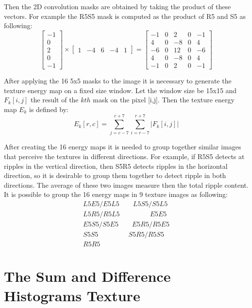 Then the 2D convolution masks are obtained by taking the product of these vectors. For example the R5S5 mask is computed as the product of R5 and S5 as following:
\begin{equation}
\begin{bmatrix}
-1\\0\\2\\0\\-1
\end{bmatrix}
\times
\begin{bmatrix}
1&-4&6&-4&1
\end{bmatrix}
=
\begin{bmatrix}
-1&0&2&0&-1\\
4&0&-8&0&4\\
-6&0&12&0&-6\\
4&0&-8&0&4\\
-1&0&2&0&-1
\end{bmatrix}
\end{equation}

After applying the 16 5x5 masks to the image it is necessary to generate the texture energy map on a fixed size window. Let the window size be 15x15 and $F_k[i,j]$ the result of the $kth$ mask on the pixel [i,j]. Then the texture energy map $E_k$ is defined by:
\begin{equation}
E_k[r,c] = \sum_{j=c-7}^{c+7}\sum_{i=r-7}^{r+7} |F_k[i,j]|   
\end{equation}

After creating the 16 energy maps it is needed to group together similar images that perceive the textures in different directions. For example, if R5S5 detects at ripples in the vertical direction, then S5R5 detects ripples in the horizontal direction, so it is desirable to group them together to detect ripple in both directions. The average of these two images measure then the total ripple content. It is possible to group the 16 energy maps in 9 texture images as following:
\begin{align*}
L5E5/E5L5\qquad L5S5/S5L5\\
L5R5/R5L5\qquad\qquad\ \ E5E5\\
E5S5/S5E5\qquad E5R5/R5E5\\
S5S5\qquad\qquad\ \ S5R5/R5S5\\
R5R5
\end{align*}


\section{The Sum and Difference Histograms Texture}
\label{sec:sum_and_diff_hist_texture}
